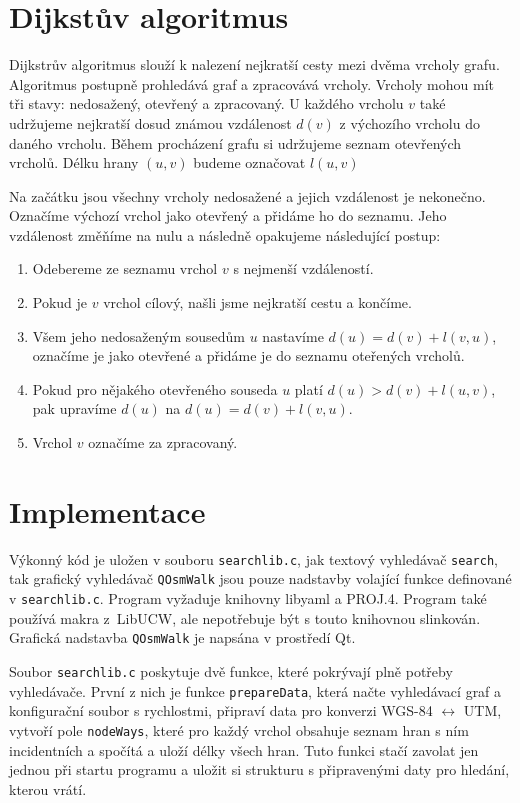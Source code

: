 \section{Dijkstův algoritmus}
Dijkstrův algoritmus \cite{dijkstra} slouží k nalezení nejkratší cesty mezi dvěma vrcholy grafu.
Algoritmus postupně prohledává graf a zpracovává vrcholy. Vrcholy mohou mít tři
stavy: nedosažený, otevřený a zpracovaný. U každého vrcholu $v$ také udržujeme
nejkratší dosud známou vzdálenost $d(v)$ z výchozího vrcholu do daného vrcholu. 
Během procházení grafu si udržujeme seznam otevřených vrcholů. Délku hrany
$(u,v)$ budeme označovat $l(u,v)$

Na začátku jsou všechny vrcholy nedosažené a jejich vzdálenost je nekonečno.
Označíme výchozí vrchol jako otevřený a přidáme ho do seznamu. Jeho vzdálenost
změňíme na nulu a následně opakujeme následující postup:
\begin{enumerate}
	\item Odebereme ze seznamu vrchol $v$ s nejmenší vzdáleností. 
	\item Pokud je $v$ vrchol cílový, našli jsme nejkratší cestu a končíme.
	\item Všem jeho nedosaženým sousedům $u$ nastavíme $d(u)=d(v)+l(v,u)$,
	označíme je jako otevřené a přidáme je do seznamu oteřených vrcholů.
	\item Pokud pro nějakého otevřeného souseda $u$ platí $d(u) >
	d(v)+l(u,v)$, pak upravíme $d(u)$ na $d(u)=d(v)+l(v,u)$.
	\item Vrchol $v$ označíme za zpracovaný.
\end{enumerate}


\section{Implementace}
Výkonný kód je uložen v souboru \verb|searchlib.c|, jak textový vyhledávač
\verb|search|, tak grafický vyhledávač \verb|QOsmWalk| jsou pouze nadstavby
volající funkce definované v \verb|searchlib.c|. Program vyžaduje knihovny {\tuc libyaml} a
{\tuc PROJ.4}. Program také používá makra z~{\tuc LibUCW}, ale nepotřebuje být s touto
knihovnou slinkován. Grafická nadstavba \verb|QOsmWalk| je napsána v prostředí
Qt.

Soubor \verb|searchlib.c| poskytuje dvě funkce, které pokrývají plně potřeby
vyhledávače. První z nich je funkce \verb|prepareData|, která načte vyhledávací
graf a konfigurační soubor s rychlostmi, připraví data pro konverzi WGS-84
$\leftrightarrow$ UTM, vytvoří pole \verb|nodeWays|, které pro každý vrchol
obsahuje seznam hran s ním incidentních a spočítá a uloží délky všech hran. Tuto
funkci stačí zavolat jen jednou při startu programu a uložit si strukturu s
připravenými daty pro hledání, kterou vrátí.

